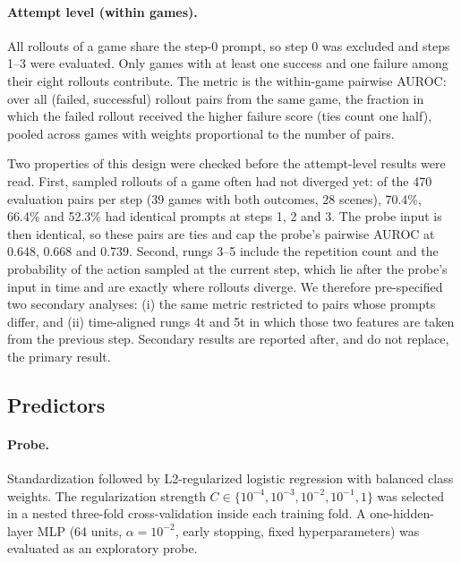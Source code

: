 \documentclass[11pt]{article}
\begin{document}
\paragraph{Attempt level (within games).} All rollouts of a game share the step-0 prompt, so step 0 was excluded and steps 1--3 were evaluated.
Only games with at least one success and one failure among their eight rollouts contribute. The metric is the within-game pairwise AUROC:
over all (failed, successful) rollout pairs from the same game, the fraction in which the failed rollout received the higher failure score (ties count one half),
pooled across games with weights proportional to the number of pairs.

Two properties of this design were checked before the attempt-level results were read. First, sampled rollouts of a game often had not diverged yet:
of the 470 evaluation pairs per step (39 games with both outcomes, 28 scenes), 70.4\%, 66.4\% and 52.3\% had identical prompts at steps 1, 2 and 3.
The probe input is then identical, so these pairs are ties and cap the probe's pairwise AUROC at 0.648, 0.668 and 0.739.
Second, rungs 3--5 include the repetition count and the probability of the action sampled at the current step, which lie after the probe's input in time
and are exactly where rollouts diverge. We therefore pre-specified two secondary analyses: (i) the same metric restricted to pairs whose prompts differ,
and (ii) time-aligned rungs 4t and 5t in which those two features are taken from the previous step. Secondary results are reported after, and do not replace, the primary result.

\subsection{Predictors}
\paragraph{Probe.} Standardization followed by L2-regularized logistic regression with balanced class weights.
The regularization strength $C \in \{10^{-4}, 10^{-3}, 10^{-2}, 10^{-1}, 1\}$ was selected in a nested three-fold cross-validation inside each training fold.
A one-hidden-layer MLP (64 units, $\alpha = 10^{-2}$, early stopping, fixed hyperparameters) was evaluated as an exploratory probe.
\end{document}
